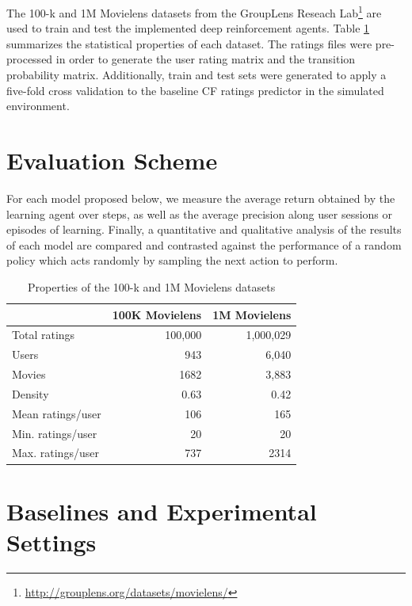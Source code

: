 The 100-k and 1M Movielens datasets \cite{harper2016movielens} from the GroupLens Reseach Lab\footnote{\url{http://grouplens.org/datasets/movielens/}} are used to train and test the implemented deep reinforcement agents. Table \ref{table:dataset} summarizes the statistical properties of each dataset. The ratings files were pre-processed in order to generate the user rating matrix and the transition probability matrix. Additionally, train and test sets were generated to apply a five-fold cross validation to the baseline CF ratings predictor in the simulated environment.

\section{Evaluation Scheme}

For each model proposed below, we measure the average return obtained by the learning agent over steps, as well as the average precision along user sessions or episodes of learning. Finally, a quantitative and qualitative analysis of the results of each model are compared and contrasted against the performance of a random policy which acts randomly by sampling the next action to perform.

\begin{table}[t]
\centering
\begin{tabular}{ |l|r|r| }
  \hline
  & 100K Movielens & 1M Movielens \\
  \hline
  Total ratings & 100,000 & 1,000,029 \\
  Users & 943 & 6,040 \\
  Movies & 1682 & 3,883 \\
  Density & 0.63 & 0.42 \\
  Mean ratings/user & 106 & 165 \\
  Min. ratings/user & 20 & 20 \\
  Max. ratings/user & 737 & 2314 \\
  \hline
\end{tabular}
\caption{Properties of the 100-k and 1M Movielens datasets}
\label{table:dataset}
\end{table}

\section{Baselines and Experimental Settings}

